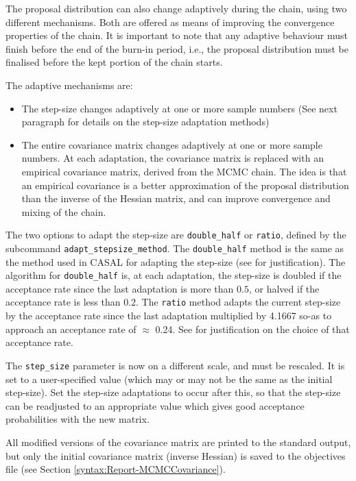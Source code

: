 The proposal distribution can also change adaptively during the chain, using two different mechanisms. Both are offered as means of improving the convergence properties of the chain. It is important to note that any adaptive behaviour must finish before the end of the burn-in period, i.e., the proposal distribution must be finalised before the kept portion of the chain starts.

The adaptive mechanisms are:

\begin{itemize}
\item The step-size changes adaptively at one or more sample numbers (See next paragraph for details on the step-size adaptation methods)
\item The entire covariance matrix changes adaptively at one or more sample numbers. At each adaptation, the covariance matrix is replaced with an empirical covariance matrix, derived from the MCMC chain. The idea is that an empirical covariance is a better approximation of the proposal distribution than the inverse of the Hessian matrix, and can improve convergence and mixing of the chain.
\end{itemize}

The two options to adapt the step-size are \texttt{double\_half} or \texttt{ratio}, defined by the subcommand \texttt{adapt\_stepsize\_method}. The \texttt{double\_half} method is the same as the method used in CASAL for adapting the step-size (see \cite{823} for justification). The algorithm for \texttt{double\_half} is, at each adaptation, the step-size is doubled if the acceptance rate since the last adaptation is more than $0.5$, or halved if the acceptance rate is less than $0.2$. The \texttt{ratio} method adapts the current step-size by the acceptance rate since the last adaptation multiplied by 4.1667 so-as to approach an acceptance rate of $\approx$ 0.24. See \cite{mcmc_rate} for justification on the choice of that acceptance rate.

The \texttt{step\_size} parameter is now on a different scale, and must be rescaled. It is set to a user-specified value (which may or may not be the same as the initial step-size). Set the step-size adaptations to occur after this, so that the step-size can be readjusted to an appropriate value which gives good acceptance probabilities with the new matrix.

All modified versions of the covariance matrix are printed to the standard output, but only the initial covariance matrix (inverse Hessian) is saved to the objectives file (see Section \ref{syntax:Report-MCMCCovariance}). \label{sec:Report-MCMCCovariance}  


